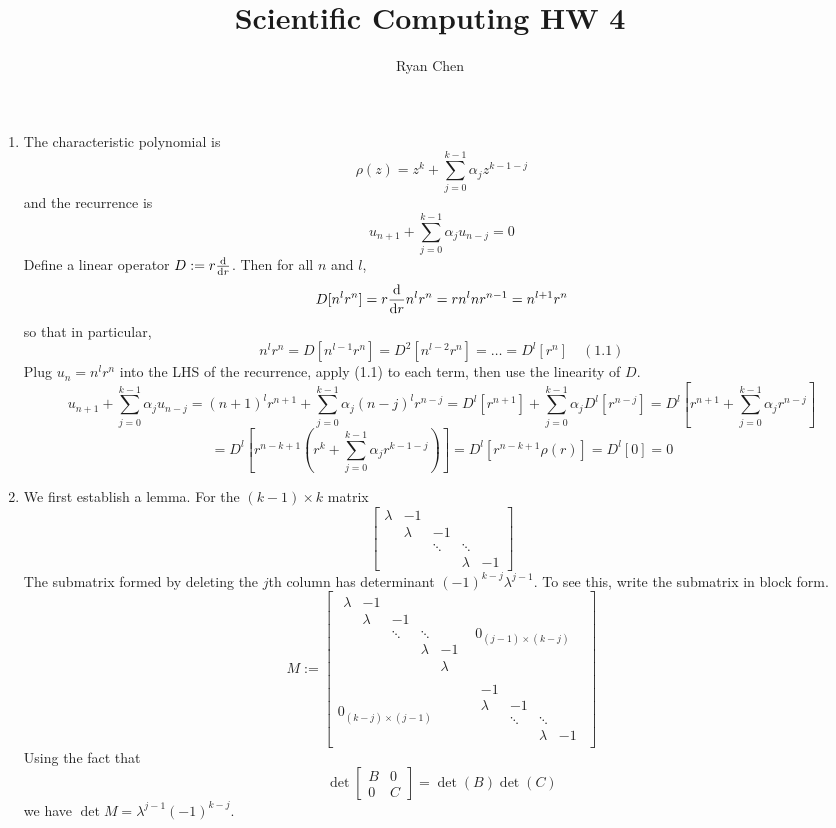 \documentclass{article}
\title{Scientific Computing HW 4}
\author{Ryan Chen}
\newcommand{\br}[1]{\left(#1\right)}
\newcommand{\sbr}[1]{\left[#1\right]}
\newcommand{\m}[2][b]{\begin{#1matrix}#2\end{#1matrix}}
\begin{document}
	
\maketitle



\begin{enumerate}
	
	
	
\item The characteristic polynomial is
$$\rho(z) = z^k + \sum_{j=0}^{k-1}\alpha_jz^{k-1-j}$$
and the recurrence is
$$u_{n+1} + \sum_{j=0}^{k-1}\alpha_ju_{n-j} = 0$$
Define a linear operator $D:=r\dv{r}$. Then for all $n$ and $l$,
$$D[n^lr^n] = r\dv{r} n^lr^n = rn^lnr^{n-1} = n^{l+1}r^n$$
so that in particular,
$$n^lr^n = D[n^{l-1}r^n] = D^2[n^{l-2}r^n] = \ldots = D^l[r^n] \quad (1.1)$$
Plug $u_n=n^lr^n$ into the LHS of the recurrence, apply (1.1) to each term, then use the linearity of $D$.
$$u_{n+1} + \sum_{j=0}^{k-1}\alpha_ju_{n-j} = (n+1)^lr^{n+1} + \sum_{j=0}^{k-1}\alpha_j(n-j)^lr^{n-j}
= D^l[r^{n+1}] + \sum_{j=0}^{k-1}\alpha_j D^l[r^{n-j}]
= D^l\sbr{r^{n+1} + \sum_{j=0}^{k-1}\alpha_j r^{n-j}}$$
$$= D^l\sbr{r^{n-k+1}\br{r^k + \sum_{j=0}^{k-1}\alpha_jr^{k-1-j}}}
= D^l[r^{n-k+1}\rho(r)]
= D^l[0]
= 0$$



\item We first establish a lemma. For the $(k-1)\times k$ matrix
$$\m{\lambda & -1 \\ & \lambda & -1 \\ & & \ddots & \ddots \\ & & & \lambda & -1}$$
The submatrix formed by deleting the $j$th column has determinant $(-1)^{k-j}\lambda^{j-1}$. To see this, write the submatrix in block form.
$$M :=
\m{\m[]{\lambda & -1 \\ & \lambda & -1 \\ & & \ddots & \ddots \\ & & & \lambda & -1 \\ & & & & \lambda}
	& 0_{(j-1)\times(k-j)} \\
	0_{(k-j)\times(j-1)}
	& \m[]{-1 \\ \lambda & -1 \\ & \ddots & \ddots \\ & & \lambda & -1}}$$
Using the fact that
$$\det \m{B & 0 \\ 0 & C} = \det(B)\det(C)$$
we have $\det M = \lambda^{j-1}(-1)^{k-j}$.\\


\end{enumerate}
\end{document}
